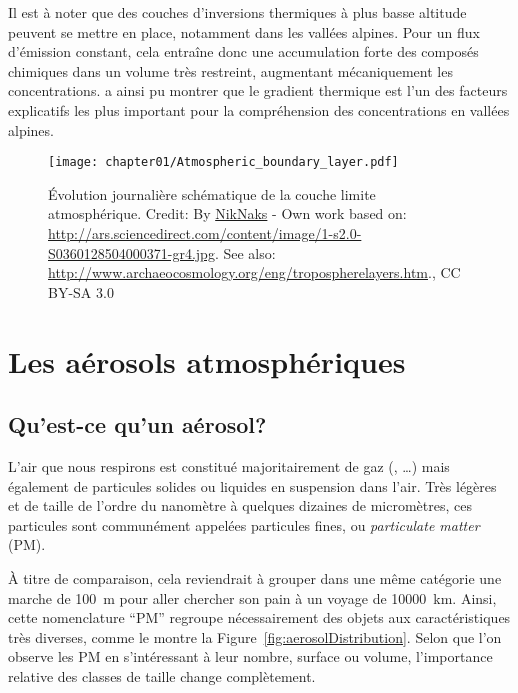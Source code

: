 Il est à noter que des couches d'inversions thermiques à plus basse altitude peuvent se
mettre en place, notamment dans les vallées alpines. Pour un flux d'émission
constant, cela entraîne donc une accumulation forte des composés chimiques dans un volume
très restreint, augmentant mécaniquement les concentrations.
\cite{allardQualite2018} a ainsi pu montrer que le gradient thermique est l'un des
facteurs explicatifs les plus important pour la compréhension des concentrations en
vallées alpines.

\begin{figure}[h]
    \centering
    \texttt{[image: chapter01/Atmospheric\_boundary\_layer.pdf]}
    \caption{Évolution journalière schématique de la couche limite atmosphérique.
        Credit: By
        \href{https://commons.wikimedia.org/w/index.php?curid=18862904}{NikNaks} - Own
        work based on:
        \url{http://ars.sciencedirect.com/content/image/1-s2.0-S0360128504000371-gr4.jpg}.
        See also: \url{http://www.archaeocosmology.org/eng/tropospherelayers.htm}., CC
        BY-SA 3.0
    }%
    \label{fig:chapter01/Atmospheric_boundary_layer}
\end{figure}


\section{Les aérosols atmosphériques}%
\label{sec:les_aerosols_atmospheriques}

\subsection{Qu'est-ce qu'un aérosol?}%
\label{sub:quest-ce-quun-aerosol}

L'air que nous respirons est constitué majoritairement de gaz (, …) mais
également de particules solides ou liquides en suspension dans l'air. Très
légères et de taille de l'ordre du nanomètre à quelques dizaines de micromètres,
ces particules sont communément appelées particules fines, ou \textit{particulate matter} (PM).

À titre de comparaison, cela reviendrait à grouper dans une même catégorie une marche de
\SI{100}{m} pour aller chercher son pain à un voyage de \SI{10000}{km}.
Ainsi, cette nomenclature ``PM'' regroupe nécessairement des objets aux caractéristiques
très diverses, comme le montre la Figure~\ref{fig:aerosolDistribution}. Selon
que l'on observe les PM en s'intéressant à leur nombre, surface ou volume, l'importance
relative des classes de taille change complètement.

